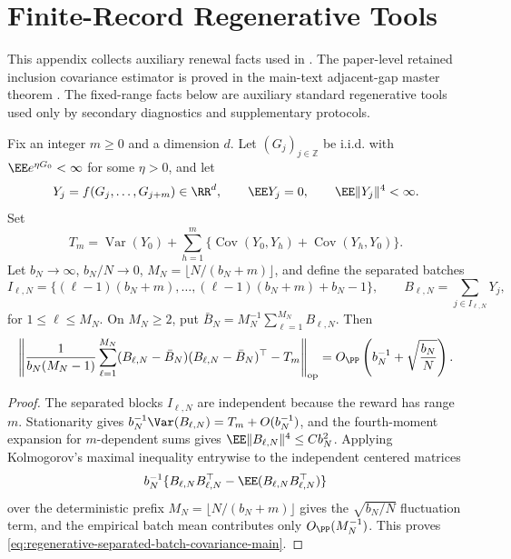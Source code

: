 \section{Finite-Record Regenerative Tools}\label{app:finite-record-regenerative-tools-main}

This appendix collects auxiliary renewal facts used in .
The paper-level retained inclusion covariance estimator is proved in the
main-text adjacent-gap master theorem
.  The fixed-range
facts below are auxiliary standard regenerative tools used only by secondary
diagnostics and supplementary protocols.

\begin{proposition}\label{thm:regenerative-separated-batch-covariance-main}
Fix an integer \(m\ge0\) and a dimension \(d\).  Let
\((G_j)_{j\in\mathbb Z}\) be i.i.d. with
\(\EE e^{\eta G_0}<\infty\) for some \(\eta>0\), and let
\[
Y_j=f(G_j,\ldots,G_{j+m})\in\RR^d,\qquad
\EE Y_j=0,\qquad \EE\|Y_j\|^4<\infty .
\]
Set
\[
T_m=\operatorname{Var}(Y_0)+
\sum_{h=1}^m\{\operatorname{Cov}(Y_0,Y_h)+\operatorname{Cov}(Y_h,Y_0)\}.
\]
Let \(b_N\to\infty\), \(b_N/N\to0\),
\(M_N=\lfloor N/(b_N+m)\rfloor\), and define the separated batches
\[
I_{\ell,N}=\{(\ell-1)(b_N+m),\ldots,
(\ell-1)(b_N+m)+b_N-1\},\qquad
B_{\ell,N}=\sum_{j\in I_{\ell,N}}Y_j ,
\]
for \(1\le\ell\le M_N\).  On \(M_N\ge2\), put
\(\bar B_N=M_N^{-1}\sum_{\ell=1}^{M_N}B_{\ell,N}\).  Then
\begin{equation}\label{eq:regenerative-separated-batch-covariance-main}
\left\|
\frac{1}{b_N(M_N-1)}
\sum_{\ell=1}^{M_N}(B_{\ell,N}-\bar B_N)
(B_{\ell,N}-\bar B_N)^\top
-T_m
\right\|_{\operatorname{op}}
=O_{\PP}\left(b_N^{-1}+\sqrt{\frac{b_N}{N}}\right).
\end{equation}
\end{proposition}

\begin{proof}
The separated blocks \(I_{\ell,N}\) are independent because the reward has
range \(m\).  Stationarity gives
\(b_N^{-1}\Var(B_{\ell,N})=T_m+O(b_N^{-1})\), and the fourth-moment expansion
for \(m\)-dependent sums gives \(\EE\|B_{\ell,N}\|^4\le Cb_N^2\).  Applying
Kolmogorov's maximal inequality entrywise to the independent centered matrices
\[
b_N^{-1}\{B_{\ell,N}B_{\ell,N}^\top-\EE(B_{\ell,N}B_{\ell,N}^\top)\}
\]
over the deterministic prefix \(M_N=\lfloor N/(b_N+m)\rfloor\) gives the
\(\sqrt{b_N/N}\) fluctuation term, and the empirical batch mean contributes
only \(O_{\PP}(M_N^{-1})\).  This proves
\eqref{eq:regenerative-separated-batch-covariance-main}.
\end{proof}

